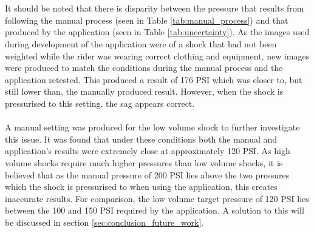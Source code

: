 			\\\\
			It should be noted that there is disparity between the pressure that results from following the manual process (seen in Table \ref{tab:manual_process}) and that produced by the application (seen in Table \ref{tab:uncertainty}). As the images used during development of the application were of a shock that had not been weighted while the rider was wearing correct clothing and equipment, new images were produced to match the conditions during the manual process and the application retested. This produced a result of 176 PSI which was closer to, but still lower than, the manually produced result. However, when the shock is pressurised to this setting, the sag appears correct. 
			\\\\
			A manual setting was produced for the low volume shock to further investigate this issue. It was found that under these conditions both the manual and application’s results were extremely close at approximately 120 PSI. As high volume shocks require much higher pressures than low volume shocks, it is believed that as the manual pressure of 200 PSI lies above the two pressures which the shock is pressurised to when using the application, this creates inaccurate results. For comparison, the low volume target pressure of 120 PSI lies between the 100 and 150 PSI required by the application. A solution to this will be discussed in section \ref{sec:conclusion_future_work}.

